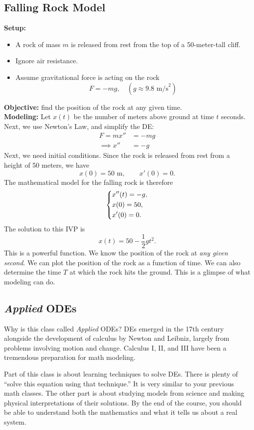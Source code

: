 \documentclass[letterpaper]{article}
\begin{document}
\subsection{Falling Rock Model}
\textbf{Setup:}
\begin{itemize}
    \item A rock of mass $m$ is released from rest from the top of a 50-meter-tall cliff.
    \item Ignore air resistance. 
    \item Assume gravitational force is acting on the rock 
\[
F=-mg, \quad (g\approx 9.8 \text{ m/s}^2)
\]
\end{itemize}
\textbf{Objective:} find the position of the rock at any given time.\\
\textbf{Modeling:} Let $x(t)$ be the number of meters above ground at time $t$ seconds. Next, we use Newton's Law, and simplify the DE:
\begin{align*}    
F = mx''&=-mg\\ 
\implies x'' &=-g
\end{align*}
Next, we need initial conditions. Since the rock is released from rest from a height of 50 meters, we have
\[
x(0)=50 \text{ m},
\qquad
x'(0)=0.
\]
The mathematical model for the falling rock is therefore
\[
\begin{dcases}
x''(t)=-g,\\
x(0)=50,\\
x'(0)=0.
\end{dcases}
\]
The solution to this IVP is 
\[
x(t) = 50 - \frac{1}{2}gt^2.
\]
This is a powerful function. We know the position of the rock at \textit{any given second}. We can plot the position of the rock as a function of time. We can also determine the time $T$ at which the rock hits the ground. This is a glimpse of what modeling can do.


\subsection{\textit{Applied} ODEs}

Why is this class called \textit{Applied} ODEs? DEs emerged in the 17th century alongside the development of calculus by Newton and Leibniz, largely from problems involving motion and change. Calculus I, II, and III have been a tremendous preparation for math modeling. 

Part of this class is about learning techniques to solve DEs. There is plenty of ``solve this equation using that technique.'' It is very similar to your previous math classes. The other part is about studying models from science and making physical interpretations of their solutions. By the end of the course, you should be able to understand both the mathematics and what it tells us about a real system.
\end{document}
